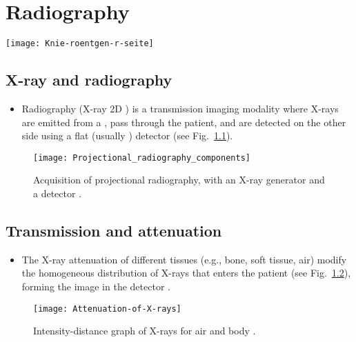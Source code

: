 \chapter{Radiography}
\vspace{-35ex}
\begin{flushright}
  \texttt{[image: Knie-roentgen-r-seite]} %
\end{flushright}

\section{X-ray and radiography}
\begin{itemize}
\item Radiography (X-ray 2D ) is a transmission imaging modality where X-rays are
  emitted from a , pass through
  the patient, and are detected on the other side using a flat
  (usually ) detector (see
  Fig.~\ref{fig:projectional_radiography}).
\end{itemize}
\vspace{-1ex}
\begin{figure}[!h]
  \centering
  \texttt{[image: Projectional\_radiography\_components]}
  \caption{Acquisition of projectional radiography, with an X-ray generator and a detector
    \cite{Wikipedia_X-ray_machine}.\label{fig:projectional_radiography}}
\end{figure}

\section{Transmission and attenuation}
\begin{itemize}
\item The X-ray attenuation of different tissues (e.g., bone, soft
  tissue, air) modify the homogeneous distribution of X-rays that
  enters the patient (see
  Fig.~\ref{fig:Attenuation-of-X-rays}), forming the image in the detector
  \cite{bushberg2011essential}.
\end{itemize}
\vspace{-1ex}
\begin{figure}[!h]
  \centering
  \texttt{[image: Attenuation-of-X-rays]}
  \caption{Intensity-distance graph of X-rays for air and body
    \cite{Attenuation_X-rays}.\label{fig:Attenuation-of-X-rays}}
\end{figure}

